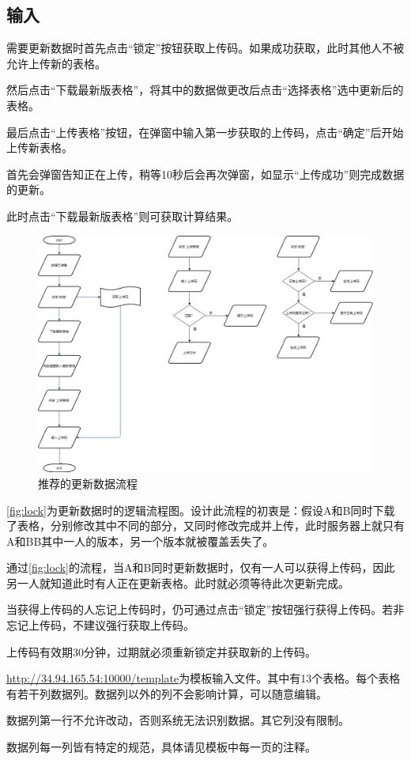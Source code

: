 \documentclass[UTF8,fontset=windowsnew]{ctexart}
\begin{document}
\subsection{输入}
需要更新数据时首先点击``锁定''按钮获取上传码。如果成功获取，此时其他人不被允许上传新的表格。\par
然后点击``下载最新版表格''，将其中的数据做更改后点击``选择表格''选中更新后的表格。\par
最后点击``上传表格''按钮，在弹窗中输入第一步获取的上传码，点击``确定''后开始上传新表格。\par
首先会弹窗告知正在上传，稍等10秒后会再次弹窗，如显示``上传成功''则完成数据的更新。\par
此时点击``下载最新版表格''则可获取计算结果。\par
\begin{figure}[h]
  \centering
  \includegraphics[width=.8\textwidth]{image/lock.png}
  \caption{推荐的更新数据流程}
  \label{fig:lock}
\end{figure}
\autoref{fig:lock}为更新数据时的逻辑流程图。设计此流程的初衷是：假设A和B同时下载了表格，分别修改其中不同的部分，又同时修改完成并上传，此时服务器上就只有A和BB其中一人的版本，另一个版本就被覆盖丢失了。\par
通过\autoref{fig:lock}的流程，当A和B同时更新数据时，仅有一人可以获得上传码，因此另一人就知道此时有人正在更新表格。此时就必须等待此次更新完成。\par
当获得上传码的人忘记上传码时，仍可通过点击``锁定''按钮强行获得上传码。若非忘记上传码，不建议强行获取上传码。\par
上传码有效期30分钟，过期就必须重新锁定并获取新的上传码。\par
\url{http://34.94.165.54:10000/template}为模板输入文件。其中有13个表格。每个表格有若干列数据列。数据列以外的列不会影响计算，可以随意编辑。\par
数据列第一行不允许改动，否则系统无法识别数据。其它列没有限制。\par
数据列每一列皆有特定的规范，具体请见模板中每一页的注释。
\end{document}
